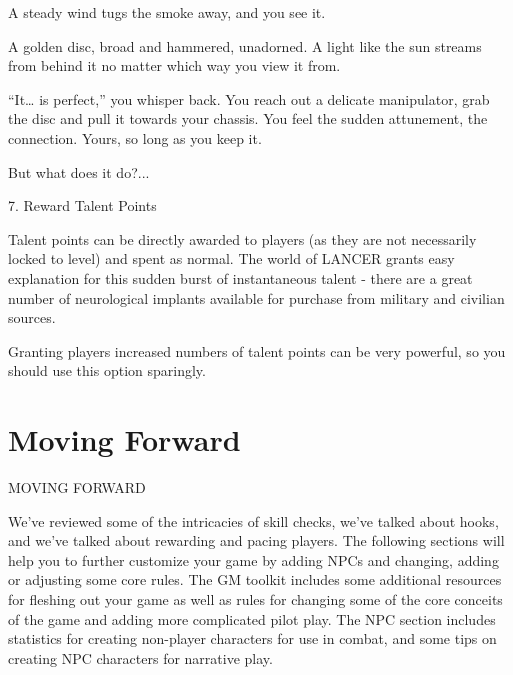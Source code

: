 A steady wind tugs the smoke away, and you see it.   

A golden disc, broad and hammered, unadorned. A light like the sun streams from behind it no  
matter which way you view it from.   

“It… is perfect,” you whisper back. You reach out a delicate manipulator, grab the disc and pull it  
towards your chassis. You feel the sudden attunement, the connection. Yours, so long as you  
keep it.   

But what does it do?...  

7. Reward Talent Points
 
Talent points can be directly awarded to players (as they are not necessarily locked to level) and  
spent as normal. The world of LANCER grants easy explanation for this sudden burst of  
instantaneous talent - there are a great number of neurological implants available for purchase  
from military and civilian sources.
 

                                                                                                               


Granting players increased numbers of talent points can be very powerful, so you should use this  
option sparingly.
 
\chapter{Moving Forward}
                                       MOVING FORWARD  

We’ve reviewed some of the intricacies of skill checks, we’ve talked about hooks, and we’ve  
talked about rewarding and pacing players. The following sections will help you to further  
customize your game by adding NPCs and changing, adding or adjusting some core rules.  
The GM toolkit includes some additional resources for fleshing out your game as well as rules  
for changing some of the core conceits of the game and adding more complicated pilot play. The  
NPC section includes statistics for creating non-player characters for use in combat, and some  
tips on creating NPC characters for narrative play.
                                                                                                                   



 